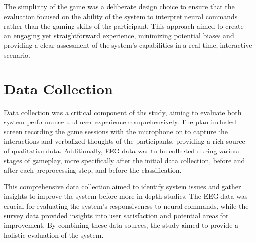 The simplicity of the game was a deliberate design choice to ensure that the evaluation focused on the ability of the system to interpret neural commands rather than the gaming skills of the participant. 
This approach aimed to create an engaging yet straightforward experience, minimizing potential biases and providing a clear assessment of the system's capabilities in a real-time, interactive scenario.

\section{Data Collection}
Data collection was a critical component of the study, aiming to evaluate both system performance and user experience comprehensively. 
The plan included screen recording the game sessions with the microphone on to capture the interactions and verbalized thoughts of the participants, providing a rich source of qualitative data. 
Additionally, EEG data was to be collected during various stages of gameplay, more specifically after the initial data collection, before and after each preprocessing step, and before the classification.

This comprehensive data collection aimed to identify system issues and gather insights to improve the system before more in-depth studies. 
The EEG data was crucial for evaluating the system's responsiveness to neural commands, while the survey data provided insights into user satisfaction and potential areas for improvement. 
By combining these data sources, the study aimed to provide a holistic evaluation of the system.

